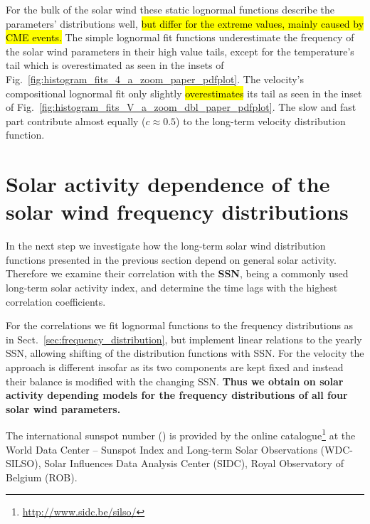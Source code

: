 For the bulk of the solar wind these static lognormal functions describe the parameters' distributions well, \hl{but differ for the extreme values, mainly caused by CME events. } 
The simple lognormal fit functions underestimate the frequency of the solar wind parameters in their high value tails, except for the temperature’s tail which is overestimated as seen in the insets of Fig.~\ref{fig:histogram_fits_4_a_zoom_paper_pdfplot}. The velocity's compositional lognormal fit only slightly \hl{overestimates } its tail as seen in the inset of Fig.~\ref{fig:histogram_fits_V_a_zoom_dbl_paper_pdfplot}.
The slow and fast part contribute almost equally ($c \approx 0.5$) to the long-term velocity distribution function.



\section{Solar activity dependence of the solar wind frequency distributions}
\label{sec:solar_activity_variations}
In the next step we investigate how the long-term solar wind distribution functions presented in the previous section depend on general solar activity. Therefore we examine their correlation with the \textbf{SSN}, being a commonly used long-term solar activity index, and determine the time lags with the highest correlation coefficients.

For the correlations we fit lognormal functions to the frequency distributions as in Sect.~\ref{sec:frequency_distribution}, but implement linear relations to the yearly SSN, allowing shifting of the distribution functions with SSN. For the velocity the approach is different insofar as its two components are kept fixed and instead their balance is modified with the changing SSN. \textbf{Thus we obtain on solar activity depending models for the frequency distributions of all four solar wind parameters.}

The international sunspot number (\citeyear{sidc}) is provided by the online catalogue\footnote{\url{http://www.sidc.be/silso/}} at the World Data Center -- Sunspot Index and Long-term Solar Observations (WDC-SILSO), Solar Influences Data Analysis Center (SIDC), Royal Observatory of Belgium (ROB).

